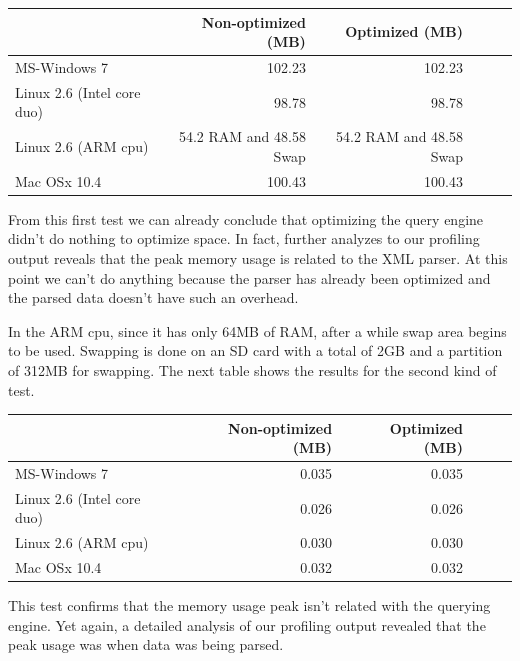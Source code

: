 \documentclass[a4paper]{report}
\begin{document}
	\begin{center}
  			\begin{tabular}{ | l | r | r | r | r | r | }
			    \hline
				       	       		     			 & Non-optimized (MB) & Optimized (MB)\\ \hline
				    MS-Windows 7   			&  102.23  & 102.23  \\ \hline
				    Linux 2.6 (Intel core duo) 	&  98.78  & 98.78  \\ \hline
				    Linux 2.6 (ARM cpu)   		&  54.2 RAM and 48.58 Swap  & 54.2 RAM and 48.58 Swap \\ \hline
				    Mac OSx 10.4   			&  100.43  & 100.43 \\ 
			    \hline
			\end{tabular}		   
	\end{center}

	From this first test we can already conclude that optimizing the query engine didn't do nothing to optimize space. In fact, further analyzes to our profiling output reveals that the peak memory usage is related to the XML 
	parser. At this point we can't do anything because the parser has already been optimized and the parsed data doesn't have such an overhead. 
	
	In the ARM cpu, since it has only 64MB of RAM, after a while swap area begins to be used. Swapping is done on an SD card with a total of 2GB and a partition of 312MB for swapping. The next table shows the results for 
	the second kind of test.
	
	\begin{center}
  			\begin{tabular}{ | l | r | r | r | r | r | }
			    \hline
				       	       		     			 & Non-optimized (MB) & Optimized (MB)\\ \hline
				    MS-Windows 7   			&  0.035  & 0.035  \\ \hline
				    Linux 2.6 (Intel core duo) 	&  0.026  & 0.026  \\ \hline
				    Linux 2.6 (ARM cpu)   		&  0.030  & 0.030 \\ \hline
				    Mac OSx 10.4   			&  0.032  & 0.032 \\ 
			    \hline
			\end{tabular}		   
	\end{center}
	
	This test confirms that the memory usage peak isn't related with the querying engine. Yet again, a detailed analysis of our profiling output revealed that the peak usage was when data was being parsed.
	
\end{document}
